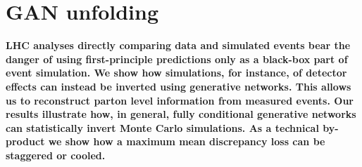 %
%
%

\chapter{GAN unfolding}\label{chap:gan}
\enlargethispage{2ex}
\vspace*{-2pt}

\enlargethispage{2ex}

{\bf LHC analyses directly comparing data and simulated events bear the
  danger of using first-principle predictions only as a black-box
  part of event simulation. We show how simulations, for instance, of
  detector effects can instead be inverted using generative
  networks. This allows us to reconstruct parton level information
  from measured events. Our results illustrate how, in general, fully
  conditional generative networks can statistically invert Monte Carlo
  simulations. As a technical by-product we show how a maximum mean
  discrepancy loss can be staggered or cooled.}

%
